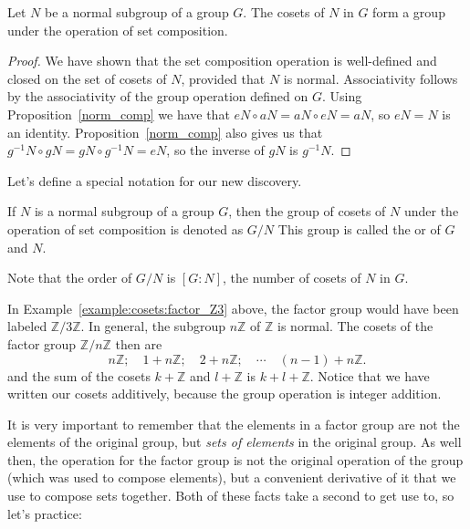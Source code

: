 {\begin{thm}
Let $N$ be a normal subgroup of a group $G$. The cosets of $N$ in $G$
form a group under the operation of set composition. 
\end{thm}
  
\begin{proof}
We have shown that the set composition operation is well-defined and closed on the set of cosets of $N$, provided that $N$ is normal. 
Associativity follows by the associativity of the group operation defined on $G$.
Using Proposition~\ref{norm_comp} we have that $eN \circ aN = aN \circ eN = aN$, so $eN = N$ is an identity.  
Proposition~\ref{norm_comp} also gives us that $g^{-1}N \circ gN = gN \circ g^{-1}N = eN$, so the inverse of $gN$ is $g^{-1} N$. 
\end{proof}

Let's define a special notation for our new discovery.

\begin{defn}\label{factor_group} 
If $N$ is a normal subgroup of a group $G$, then the group of cosets of $N$ under the operation of set composition is denoted as $G/N$\label{notefactor} This group is called the  or  of $G$ and $N$. 
\end{defn} 
Note that the order of $G/N$ is $[G:N]$, the number of cosets of $N$ in $G$. 

 

\begin{rem}
In Example~\ref{example:cosets:factor_Z3} above, the factor group would have been labeled ${\mathbb Z}/ 3 {\mathbb Z}$. In general, the subgroup $n {\mathbb Z}$ of ${\mathbb Z}$ is normal. The
cosets of the factor group ${\mathbb Z } / n {\mathbb Z}$ then are 
\[
n {\mathbb Z};\quad 1 + n {\mathbb Z}; \quad 2 + n {\mathbb Z}; \quad \cdots \quad
(n-1) + n {\mathbb Z}.
\]
and the sum of the cosets $k + {\mathbb Z}$ and $l + {\mathbb Z}$ is $k+l + 
{\mathbb Z}$. Notice that  we have written our cosets additively, 
because the group operation is integer addition. 
\end{rem}


It is very important to remember that the elements in a factor group are not the elements of the original group, but \emph{sets of elements} in the original group. As well then, the operation for the factor group is not the original operation of the group (which was used to compose elements), but a convenient derivative of it that we use to compose sets together.  Both of these facts take a second to get use to, so let's practice:

}
